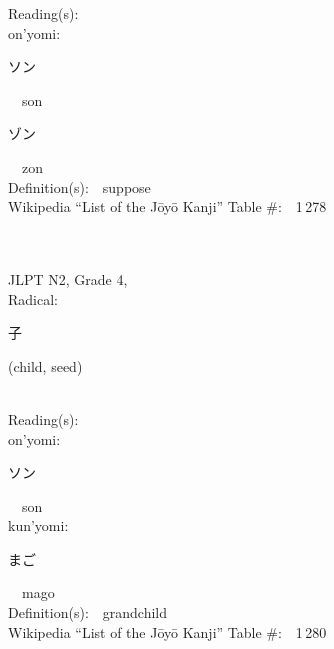 \begin{multicols}{2}
Reading(s):\ \ \\
{\hspace*{1em}}on'yomi:\ \ \\
{\hspace*{2em}}{\begin{CJK}{UTF8}{min} ソン \end{CJK}}\ \ son\ \ \\
{\hspace*{2em}}{\begin{CJK}{UTF8}{min} ゾン \end{CJK}}\ \ zon\ \ \\
Definition(s):\ \ suppose \\
Wikipedia ``List of the J\=oy\=o Kanji'' Table \#:\ \ 1\,278 \\
\ \ \\
{\fontsize{34pt}{40pt}  }\ \ \\  %
{JLPT N2, Grade 4, \\Radical:\ \ {\begin{CJK}{UTF8}{min} 子 \end{CJK}} (child, seed) } \\
Reading(s):\ \ \\
{\hspace*{1em}}on'yomi:\ \ \\
{\hspace*{2em}}{\begin{CJK}{UTF8}{min} ソン \end{CJK}}\ \ son\ \ \\
{\hspace*{1em}}kun'yomi:\ \ \\
{\hspace*{2em}}{\begin{CJK}{UTF8}{min} まご \end{CJK}}\ \ mago\ \ \\
Definition(s):\ \ grandchild \\
Wikipedia ``List of the J\=oy\=o Kanji'' Table \#:\ \ 1\,280 \\
\ \ \\
\end{multicols}



